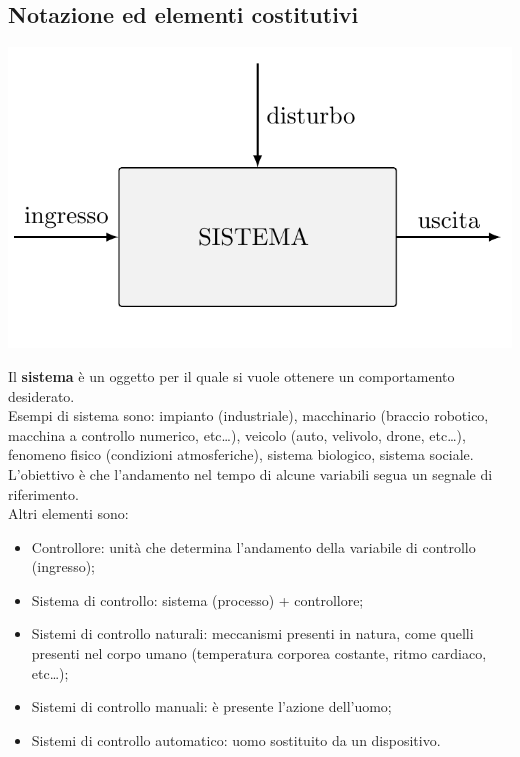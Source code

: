 \documentclass{article}
\numberwithin{equation}{subsection}
\let\oldsubsection\subsection%
\renewcommand{\subsection}{%
  \renewcommand{\theequation}{\thesubsection.\arabic{equation}}%
  \oldsubsection}%
\begin{document}
\subsection{Notazione ed elementi costitutivi}
\begin{center}
    \includegraphics[scale=0.3]{Images/Schema_sistema.png}
\end{center}
Il \textbf{sistema} è un oggetto per il quale si vuole ottenere un comportamento desiderato.
\\
Esempi di sistema sono: impianto (industriale), macchinario (braccio robotico, macchina a controllo numerico, etc\dots), veicolo (auto, velivolo, drone, etc\dots), fenomeno fisico (condizioni atmosferiche), sistema biologico, sistema sociale.
\\
L'obiettivo è che l'andamento nel tempo di alcune variabili segua un segnale di riferimento.
\vspace*{0.2cm}\\
Altri elementi sono:
\begin{itemize}
    \item Controllore: unità che determina l'andamento della variabile di controllo (ingresso);
    \item Sistema di controllo: sistema (processo) + controllore;
    \item Sistemi di controllo naturali: meccanismi presenti in natura, come  quelli presenti nel corpo umano (temperatura corporea costante, ritmo cardiaco, etc\dots);
    \item Sistemi di controllo manuali: è presente l'azione dell'uomo;
    \item Sistemi di controllo automatico: uomo sostituito da un dispositivo.
\end{itemize}
\end{document}
